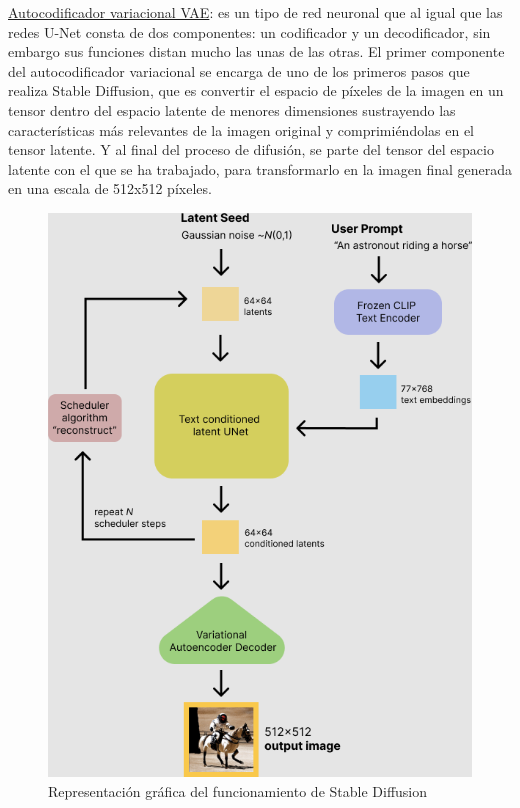 \underline{Autocodificador variacional VAE}: es un tipo de red neuronal que al igual que las redes U-Net consta de dos componentes: un codificador y un decodificador, sin embargo sus funciones distan mucho las unas de las otras. El primer componente del autocodificador variacional se encarga de uno de los primeros pasos que realiza Stable Diffusion, que es convertir el espacio de píxeles de la imagen en un tensor dentro del espacio latente de menores dimensiones sustrayendo las características más relevantes de la imagen original y comprimiéndolas en el tensor latente. Y al final del proceso de difusión, se parte del tensor del espacio latente con el que se ha trabajado, para transformarlo en la imagen final generada en una escala de 512x512 píxeles.

\begin{figure}[!hbt]
	\centering
	\includegraphics[width = 0.9
	\textwidth]{Imagenes/Vectorial/representacionvisualSD.png}
	\caption{Representación gráfica del funcionamiento de Stable Diffusion}
	\label{fig:sd}
\end{figure}

